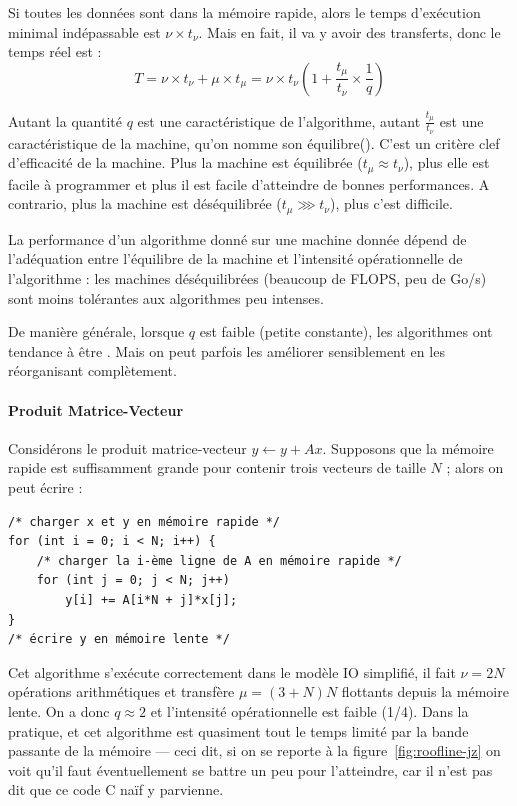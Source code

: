 Si toutes les données sont dans la mémoire rapide, alors le temps d'exécution
minimal indépassable est $\nu \times t_\nu$. Mais en fait, il va y avoir des
transferts, donc le temps réel est :
\[
  T = \nu \times t_\nu + \mu \times t_\mu = \nu \times t_\nu \left(1 + \frac{t_\mu}{t_\nu} \times \frac{1}{q} \right)
\]

Autant la quantité $q$ est une caractéristique de l'algorithme, autant
$\frac{t_\mu}{t_\nu}$ est une caractéristique de la machine, qu'on nomme son \og
équilibre\fg (). C'est un critère clef d'efficacité de
la machine. Plus la machine est équilibrée ($t_\mu \approx t_\nu$), plus elle
est facile à programmer et plus il est facile d'atteindre de bonnes
performances. A contrario, plus la machine est déséquilibrée
($t_\mu \ggg t_\nu$), plus c'est difficile.

La performance d'un algorithme donné sur une machine donnée dépend de
l'adéquation entre l'équilibre de la machine et l'intensité opérationnelle de
l'algorithme : les machines déséquilibrées (beaucoup de FLOPS, peu de Go/s) sont
moins tolérantes aux algorithmes \og peu intenses\fg.

De manière générale, lorsque $q$ est faible (petite constante), les algorithmes
ont tendance à être . Mais on peut parfois les améliorer
sensiblement en les réorganisant complètement.

\paragraph{Produit Matrice-Vecteur} Considérons le produit matrice-vecteur
$y \gets y + Ax$.  Supposons que la mémoire rapide est suffisamment grande pour
contenir trois vecteurs de taille $N$ ; alors on peut écrire :

\begin{verbatim}
/* charger x et y en mémoire rapide */
for (int i = 0; i < N; i++) {
    /* charger la i-ème ligne de A en mémoire rapide */
    for (int j = 0; j < N; j++)
        y[i] += A[i*N + j]*x[j];
}
/* écrire y en mémoire lente */
\end{verbatim}

Cet algorithme s'exécute correctement dans le modèle IO simplifié, il fait
$\nu = 2N$ opérations arithmétiques et transfère $\mu = (3+N)N$ flottants depuis
la mémoire lente. On a donc $q \approx 2$ et l'intensité opérationnelle est
faible (1/4). Dans la pratique, et cet algorithme est quasiment tout le temps
limité par la bande passante de la mémoire --- ceci dit, si on se reporte à la
figure~\ref{fig:roofline-jz} on voit qu'il faut éventuellement se battre un peu
pour l'atteindre, car il n'est pas dit que ce code C naïf y parvienne.

